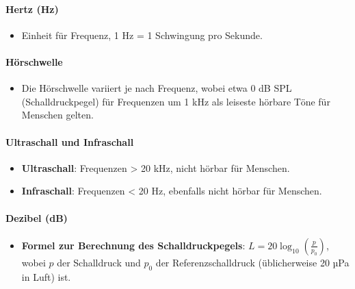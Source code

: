 \documentclass{vorlage-design-main}
\begin{document}
\hypertarget{hertz-hz-1}{%
\paragraph{Hertz (Hz)}\label{hertz-hz-1}}

\begin{itemize}

\item
  Einheit für Frequenz, 1 Hz = 1 Schwingung pro Sekunde.
\end{itemize}

\hypertarget{huxf6rschwelle-1}{%
\paragraph{Hörschwelle}\label{hoerschwelle-1}}

\begin{itemize}

\item
  Die Hörschwelle variiert je nach Frequenz, wobei etwa 0 dB SPL
  (Schalldruckpegel) für Frequenzen um 1 kHz als leiseste hörbare Töne
  für Menschen gelten.
\end{itemize}

\hypertarget{ultraschall-und-infraschall}{%
\paragraph{Ultraschall und
Infraschall}\label{ultraschall-und-infraschall}}

\begin{itemize}

\item
  \textbf{Ultraschall}: Frequenzen \textgreater{} 20 kHz, nicht hörbar
  für Menschen.
\item
  \textbf{Infraschall}: Frequenzen \textless{} 20 Hz, ebenfalls nicht
  hörbar für Menschen.
\end{itemize}

\hypertarget{dezibel-db-1}{%
\paragraph{Dezibel (dB)}\label{dezibel-db-1}}

\begin{itemize}

\item
  \textbf{Formel zur Berechnung des Schalldruckpegels}:
  $L = 20 \log_{10}(\frac{p}{p_0})$, wobei $p$ der Schalldruck und
  $p_0$ der Referenzschalldruck (üblicherweise 20 µPa in Luft) ist.
\end{itemize}
\end{document}
